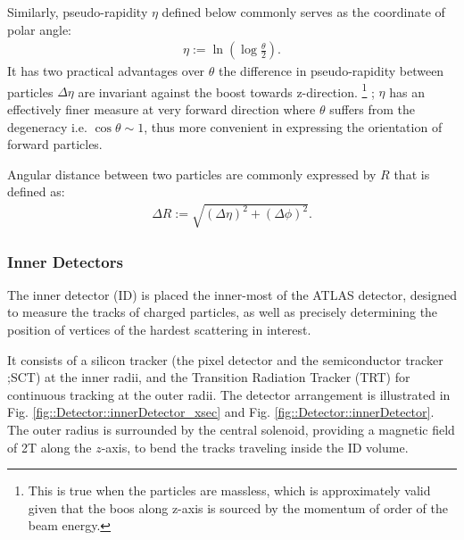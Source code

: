 Similarly, pseudo-rapidity $\eta$ defined below commonly serves as the coordinate of polar angle:
\begin{align}
\eta := \ln \left( \log{\frac{\theta}{2}} \right).
\end{align}
It has two practical advantages over $\theta$ the difference in pseudo-rapidity between particles $\Delta\eta$ are invariant against the boost towards z-direction. 
\footnote{
This is true when the particles are massless, which is approximately valid given that the boos along z-axis is sourced by the momentum of order of the beam energy.}
; $\eta$ has an effectively finer measure at very forward direction where $\theta$ suffers from the degeneracy i.e. $\cos{\theta}\sim 1$, thus more convenient in expressing the orientation of forward particles.

Angular distance between two particles are commonly expressed by $R$ that is defined as: 
\begin{align}
\Delta R := \sqrt{(\Delta\eta)^2+(\Delta\phi)^2}.
\end{align}



\subsubsection{Inner Detectors}
The inner detector (ID) is placed the inner-most of the ATLAS detector, designed to measure the tracks of charged particles, 
as well as precisely determining the position of vertices of the hardest scattering in interest.

It consists of a silicon tracker (the pixel detector and the semiconductor tracker ;SCT) at the inner radii,
and the Transition Radiation Tracker (TRT) for continuous tracking at the outer radii. 
The detector arrangement is illustrated in Fig. \ref{fig::Detector::innerDetector_xsec} and Fig. \ref{fig::Detector::innerDetector}.
The outer radius is surrounded by the central solenoid, providing a magnetic field of 2T along the $z$-axis,
to bend the tracks traveling inside the ID volume.

